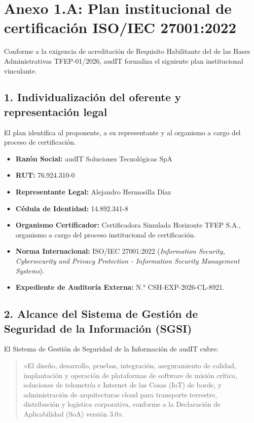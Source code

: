 
\section*{Anexo 1.A: Plan institucional de certificación ISO/IEC 27001:2022}\label{sec:1-anexo-iso}

Conforme a la exigencia de acreditación de Requisito Habilitante del  de las Bases Administrativas TFEP-01/2026, audIT formaliza el siguiente plan institucional vinculante.

\subsection*{1. Individualización del oferente y representación legal}
El plan identifica al proponente, a su representante y al organismo a cargo del proceso de certificación.
\begin{itemize}
  \item \textbf{Razón Social:} audIT Soluciones Tecnológicas SpA
  \item \textbf{RUT:} 76.924.310-0
  \item \textbf{Representante Legal:} Alejandro Hermosilla Díaz
  \item \textbf{Cédula de Identidad:} 14.892.341-8
  \item \textbf{Organismo Certificador:} Certificadora Simulada Horizonte TFEP S.A., organismo a cargo del proceso institucional de certificación.
  \item \textbf{Norma Internacional:} ISO/IEC 27001:2022 (\textit{Information Security, Cybersecurity and Privacy Protection - Information Security Management Systems}).
  \item \textbf{Expediente de Auditoría Externa:} N.° CSH-EXP-2026-CL-8921.
\end{itemize}

\subsection*{2. Alcance del Sistema de Gestión de Seguridad de la Información (SGSI)}
El Sistema de Gestión de Seguridad de la Información de audIT cubre:
\begin{quote}
«El diseño, desarrollo, pruebas, integración, aseguramiento de calidad, implantación y operación de plataformas de software de misión crítica, soluciones de telemetría e Internet de las Cosas (IoT) de borde, y administración de arquitecturas cloud para transporte terrestre, distribución y logística corporativa, conforme a la Declaración de Aplicabilidad (SoA) versión 3.0».
\end{quote}

